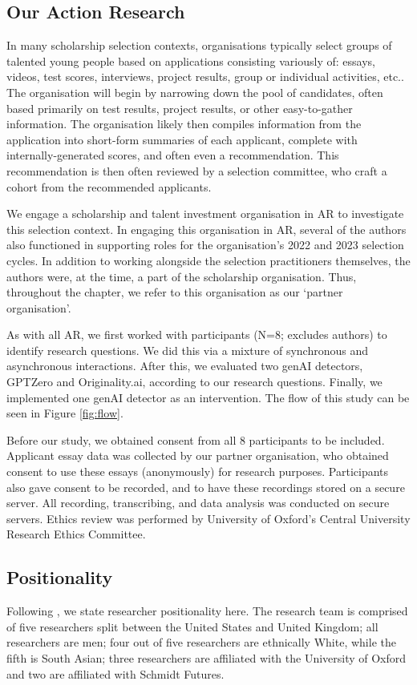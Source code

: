 \subsection{Our Action Research}
In many scholarship selection contexts, organisations typically select groups of talented young people based on applications consisting variously of: essays, videos, test scores, interviews, project results, group or individual activities, etc.. The organisation will begin by narrowing down the pool of candidates, often based primarily on test results, project results, or other easy-to-gather information. The organisation likely then compiles information from the application into short-form summaries of each applicant, complete with internally-generated scores, and often even a recommendation. This recommendation is then often reviewed by a selection committee, who craft a cohort from the recommended applicants.

We engage a scholarship and talent investment organisation in AR to investigate this selection context. In engaging this organisation in AR, several of the authors also functioned in supporting roles for the organisation's 2022 and 2023 selection cycles. In addition to working alongside the selection practitioners themselves, the authors were, at the time, a part of the scholarship organisation. Thus, throughout the chapter, we refer to this organisation as our `partner organisation'. 

As with all AR, we first worked with participants (N=8; excludes authors) to identify research questions. We did this via a mixture of synchronous and asynchronous interactions. After this, we evaluated two genAI detectors, GPTZero and Originality.ai, according to our research questions. Finally, we implemented one genAI detector as an intervention. The flow of this study can be seen in Figure \ref{fig:flow}.

Before our study, we obtained consent from all 8 participants to be included. Applicant essay data was collected by our partner organisation, who obtained consent to use these essays (anonymously) for research purposes. Participants also gave consent to be recorded, and to have these recordings stored on a secure server. All recording, transcribing, and data analysis was conducted on secure servers. Ethics review was performed by University of Oxford's Central University Research Ethics Committee.

\subsection{Positionality}
Following \textcite{venn-wycherley_realities_2024}, we state researcher positionality here. The research team is comprised of five researchers split between the United States and United Kingdom; all researchers are men; four out of five researchers are ethnically White, while the fifth is South Asian; three researchers are affiliated with the University of Oxford and two are affiliated with Schmidt Futures.

